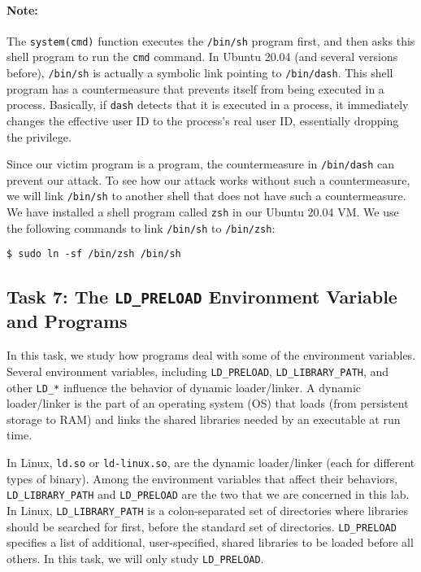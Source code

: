 \paragraph{Note:}
The \texttt{system(cmd)} function executes the \texttt{/bin/sh} program first, and then
asks this shell program to run the \texttt{cmd} command.
In Ubuntu 20.04 (and several versions before), \texttt{/bin/sh} is actually
a symbolic link pointing to \texttt{/bin/dash}.
This shell program has a countermeasure that prevents itself
from being executed in a \setuid process.  Basically, if \texttt{dash} detects that it is
executed in a \setuid process, it immediately changes the effective user ID to the process's
real user ID, essentially dropping the privilege.


Since our victim program is a \setuid program,
the countermeasure in \texttt{/bin/dash} can prevent our attack.
To see how our attack works without such a countermeasure,
we will link \texttt{/bin/sh} to another shell that does not
have such a countermeasure.  We have installed a shell program
called \texttt{zsh} in our Ubuntu 20.04 VM. We use the following
commands to link \texttt{/bin/sh} to \texttt{/bin/zsh}:

\begin{lstlisting}
$ sudo ln -sf /bin/zsh /bin/sh
\end{lstlisting}




\subsection{Task 7: The {\tt LD\_PRELOAD} Environment
Variable and \setuid Programs}


In this task, we study how \setuid programs deal
with some of the environment variables.
Several environment variables, including {\tt LD\_PRELOAD},
{\tt LD\_LIBRARY\_PATH}, and other {\tt LD\_*} influence the
behavior of dynamic loader/linker.
A dynamic loader/linker is the part of an operating system (OS) that
loads (from persistent storage to RAM) and links the shared libraries
needed by an executable at run time.

In Linux, {\tt ld.so} or {\tt ld-linux.so}, are the dynamic
loader/linker (each for different types of binary).
Among the environment variables that affect their behaviors,
{\tt LD\_LIBRARY\_PATH} and {\tt LD\_PRELOAD} are the two
that we are concerned in this lab.
In Linux, {\tt LD\_LIBRARY\_PATH} is a colon-separated set
of directories where libraries should be searched for first, before the
standard set of directories.
{\tt LD\_PRELOAD} specifies a list of additional, user-specified, shared libraries to
be loaded before all others. In this task, we will only
study {\tt LD\_PRELOAD}.


